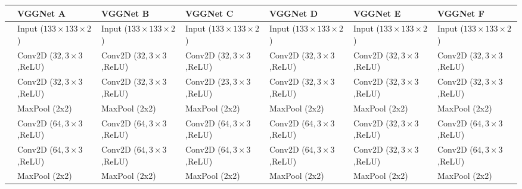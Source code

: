 
\begin{table}
    \centering
    \tiny
    \begin{tabular}{l|l|l|l|l|l|l}
         \toprule
         &\textbf{VGGNet A} & \textbf{VGGNet B} & \textbf{VGGNet C} & \textbf{VGGNet D} & \textbf{VGGNet E} & \textbf{VGGNet F} \\
         \midrule
         
         &Input ($133\times133\times2$) & Input ($133\times133\times2$) & Input ($133\times133\times2$) & Input ($133\times133\times2$) & Input ($133\times133\times2$) & Input ($133\times133\times2$) \\
         
         &Conv2D ($32,3\times3$,ReLU) & Conv2D ($32,3\times3$,ReLU) & Conv2D ($32,3\times3$,ReLU) & Conv2D ($32,3\times3$,ReLU) & Conv2D ($32,3\times3$,ReLU) & Conv2D ($32,3\times3$,ReLU) \\
         
         &Conv2D ($32,3\times3$,ReLU) & Conv2D ($32,3\times3$,ReLU) & Conv2D ($23,3\times3$,ReLU) & Conv2D ($32,3\times3$,ReLU) & Conv2D ($32,3\times3$,ReLU) & Conv2D ($32,3\times3$,ReLU) \\
         
         &MaxPool (2x2) & MaxPool (2x2) & MaxPool (2x2) & MaxPool (2x2) & MaxPool (2x2) & MaxPool (2x2) \\
         \midrule
         
         &Conv2D ($64,3\times3$,ReLU) & Conv2D ($64,3\times3$,ReLU) & Conv2D ($64,3\times3$,ReLU) & Conv2D ($64,3\times3$,ReLU) & Conv2D ($32,3\times3$,ReLU) & Conv2D ($64,3\times3$,ReLU) \\
         
         &Conv2D ($64,3\times3$,ReLU) & Conv2D ($64,3\times3$,ReLU) & Conv2D ($64,3\times3$,ReLU) & Conv2D ($64,3\times3$,ReLU) & Conv2D ($32,3\times3$,ReLU) & Conv2D ($64,3\times3$,ReLU) \\
         
         &MaxPool (2x2) & MaxPool (2x2) & MaxPool (2x2) & MaxPool (2x2) & MaxPool (2x2) & MaxPool (2x2) \\
         \midrule
         

\end{tabular}
\end{table}
